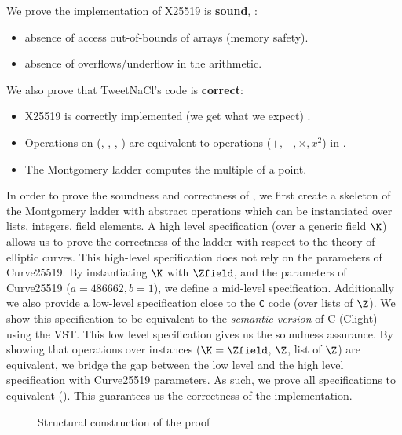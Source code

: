 We prove the implementation of X25519 is \textbf{sound}, \ie:
\begin{itemize}
\item absence of access out-of-bounds of arrays (memory safety).
\item absence of overflows/underflow in the arithmetic.
\end{itemize}
We also prove that TweetNaCl's code is \textbf{correct}:
\begin{itemize}
\item X25519 is correctly implemented (we get what we expect) .
\item Operations on  (, , , )
are equivalent to operations ($+,-,\times,x^2$) in \Zfield.
\item The Montgomery ladder computes the multiple of a point.
\end{itemize}

In order to prove the soundness and correctness of ,
we first create a skeleton of the Montgomery ladder with abstract operations which
can be instantiated over \eg lists, integers, field elements.
A high level specification (over a generic field $\K$) allows us to prove the
correctness of the ladder with respect to the theory of elliptic curves.
This high-level specification does not rely on the parameters of Curve25519.
By instantiating $\K$ with $\Zfield$, and the parameters of Curve25519 ($a = 486662, b = 1$),
we define a mid-level specification.
Additionally we also provide a low-level specification close to the \texttt{C} code
(over lists of $\Z$). We show this specification to be equivalent to the
\emph{semantic version} of C (Clight) using the VST.
This low level specification gives us the soundness assurance.
By showing that operations over instances ($\K = \Zfield$, $\Z$, list of $\Z$) are
equivalent, we bridge the gap between the low level and the high level specification
with Curve25519 parameters.
As such, we prove all specifications to equivalent ().
This guarantees us the correctness of the implementation.

\begin{figure}[h]
  \centering
  
  \caption{Structural construction of the proof}
  \label{tikz:ProofStructure}
\end{figure}





